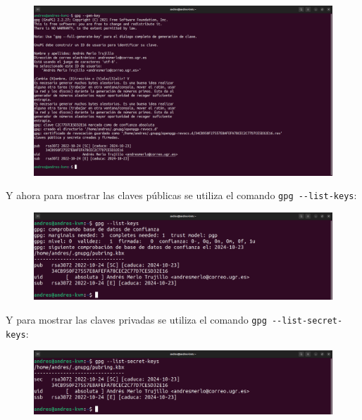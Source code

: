 \documentclass{article}
\begin{document}
\begin{figure}[H]
    \includegraphics[width=\textwidth]{imagenes/Portatil/Captura desde 2022-10-24 11-46-02.png}
\end{figure}

Y ahora para mostrar las claves públicas se utiliza el comando \verb|gpg --list-keys|:

\begin{figure}[H]
    \includegraphics[width=\textwidth]{imagenes/Portatil/Captura desde 2022-10-24 11-46-16.png}
\end{figure}

\newpage

Y para mostrar las claves privadas se utiliza el comando \verb|gpg --list-secret-keys|:

\begin{figure}[H]
    \includegraphics[width=\textwidth]{imagenes/Portatil/Captura desde 2022-10-24 11-46-25.png}
\end{figure}

\end{document}
